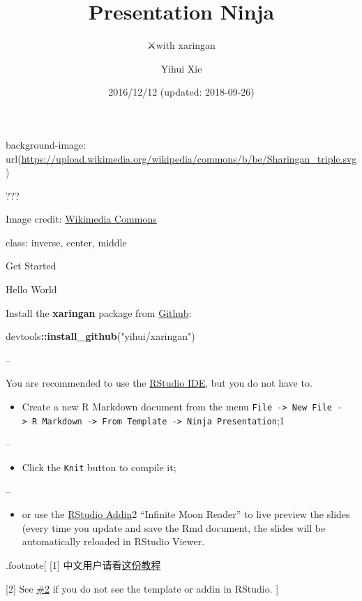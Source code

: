 \documentclass[ignorenonframetext,]{beamer}
\title{Presentation Ninja}
\subtitle{⚔with xaringan}
\author{Yihui Xie}
\date{2016/12/12 (updated: 2018-09-26)}
\newenvironment{Shaded}{\begin{snugshade}}{\end{snugshade}}
\newcommand{\KeywordTok}[1]{\textcolor[rgb]{0.13,0.29,0.53}{\textbf{#1}}}
\newcommand{\NormalTok}[1]{#1}
\newcommand{\OperatorTok}[1]{\textcolor[rgb]{0.81,0.36,0.00}{\textbf{#1}}}
\newcommand{\StringTok}[1]{\textcolor[rgb]{0.31,0.60,0.02}{#1}}
\providecommand{\tightlist}{%
  \setlength{\itemsep}{0pt}\setlength{\parskip}{0pt}}
\begin{document}
\frame{\titlepage}

\begin{frame}

background-image:
url(\url{https://upload.wikimedia.org/wikipedia/commons/b/be/Sharingan_triple.svg})

???

Image credit:
\href{https://commons.wikimedia.org/wiki/File:Sharingan_triple.svg}{Wikimedia
Commons}

class: inverse, center, middle

\end{frame}

\begin{frame}{Get Started}
\protect\hypertarget{get-started}{}

\end{frame}

\begin{frame}[fragile]{Hello World}
\protect\hypertarget{hello-world}{}

Install the \textbf{xaringan} package from
\href{https://github.com/yihui/xaringan}{Github}:

\begin{Shaded}
\begin{Highlighting}[]
\NormalTok{devtools}\OperatorTok{::}\KeywordTok{install_github}\NormalTok{(}\StringTok{"yihui/xaringan"}\NormalTok{)}
\end{Highlighting}
\end{Shaded}

--

You are recommended to use the
\href{https://www.rstudio.com/products/rstudio/}{RStudio IDE}, but you
do not have to.

\begin{itemize}
\tightlist
\item
  Create a new R Markdown document from the menu
  \texttt{File\ -\textgreater{}\ New\ File\ -\textgreater{}\ R\ Markdown\ -\textgreater{}\ From\ Template\ -\textgreater{}\ Ninja\ Presentation};1
\end{itemize}

--

\begin{itemize}
\tightlist
\item
  Click the \texttt{Knit} button to compile it;
\end{itemize}

--

\begin{itemize}
\tightlist
\item
  or use the \href{https://rstudio.github.io/rstudioaddins/}{RStudio
  Addin}2 ``Infinite Moon Reader'' to live preview the slides (every
  time you update and save the Rmd document, the slides will be
  automatically reloaded in RStudio Viewer.
\end{itemize}

.footnote{[} {[}1{]}
中文用户请看\href{http://slides.yihui.name/xaringan/zh-CN.html}{这份教程}

{[}2{]} See \href{https://github.com/yihui/xaringan/issues/2}{\#2} if
you do not see the template or addin in RStudio. {]}

\end{frame}
\end{document}
